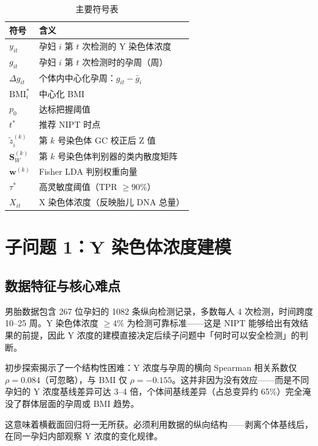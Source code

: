 \documentclass{mcm-paper}
\begin{document}
\begin{table}[H]
\centering
\caption{主要符号表}
\begin{tabular}{ll}
\toprule
符号 & 含义 \\
\midrule
$y_{it}$ & 孕妇 $i$ 第 $t$ 次检测的 Y 染色体浓度 \\
$g_{it}$ & 孕妇 $i$ 第 $t$ 次检测时的孕周（周） \\
$\Delta g_{it}$ & 个体内中心化孕周：$g_{it}-\bar{g}_i$ \\
$\mathrm{BMI}_i^*$ & 中心化 BMI \\
$p_0$ & 达标把握阈值 \\
$t^*$ & 推荐 NIPT 时点 \\
$\tilde{z}_i^{(k)}$ & 第 $k$ 号染色体 GC 校正后 Z 值 \\
$\mathbf{S}_W^{(k)}$ & 第 $k$ 号染色体判别器的类内散度矩阵 \\
$\mathbf{w}^{(k)}$ & Fisher LDA 判别权重向量 \\
$\tau^*$ & 高灵敏度阈值（TPR $\geq 90\%$） \\
$X_{it}$ & X 染色体浓度（反映胎儿 DNA 总量） \\
\bottomrule
\end{tabular}
\end{table}

\newpage

\section{子问题 1：Y 染色体浓度建模}

\subsection{数据特征与核心难点}

男胎数据包含 267 位孕妇的 1082 条纵向检测记录，多数每人 4 次检测，时间跨度 10--25 周。Y 染色体浓度 $\geq 4\%$ 为检测可靠标准——这是 NIPT 能够给出有效结果的前提，因此 Y 浓度的建模直接决定后续子问题中「何时可以安全检测」的判断。

初步探索揭示了一个结构性困难：Y 浓度与孕周的横向 Spearman 相关系数仅 $\rho=0.084$（可忽略），与 BMI 仅 $\rho=-0.155$。这并非因为没有效应——而是不同孕妇的 Y 浓度基线差异可达 3--4 倍，个体间基线差异（占总变异约 65\%）完全淹没了群体层面的孕周或 BMI 趋势。

这意味着横截面回归将一无所获。必须利用数据的纵向结构——剥离个体基线后，在同一孕妇内部观察 Y 浓度的变化规律。
\end{document}
